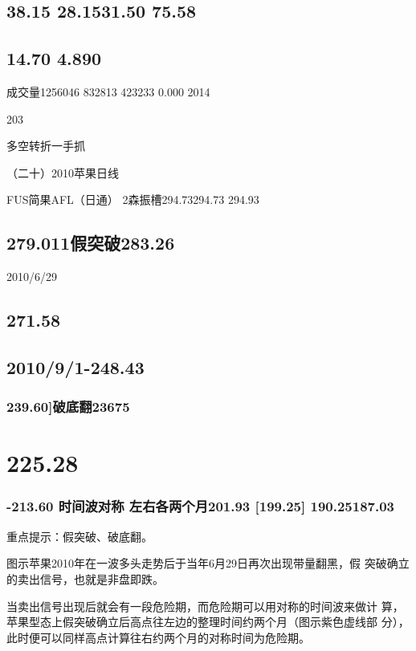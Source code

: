 \documentclass{article}
\begin{document}
\subsection{38.15 28.1531.50 75.58}

\subsection{14.70 4.890}

成交量1256046 832813 423233 0.000 2014

203

\clearpage

多空转折一手抓

（二十）2010苹果日线

FUS简果AFL（日通） 2森振槽294.73294.73 294.93

\subsection{279.011假突破283.26}

2010/6/29

\subsection{271.58}

\subsection{2010/9/1-248.43}

\subsubsection{239.60]破底翻23675}

\section{225.28}

\subsubsection{-213.60 时间波对称 左右各两个月201.93 [199.25] 190.25187.03}

重点提示：假突破、破底翻。

图示苹果2010年在一波多头走势后于当年6月29日再次出现带量翻黑，假 突破确立的卖出信号，也就是非盘即跌。

当卖出信号出现后就会有一段危险期，而危险期可以用对称的时间波来做计 算，苹果型态上假突破确立后高点往左边的整理时间约两个月（图示紫色虚线部 分），此时便可以同样高点计算往右约两个月的对称时间为危险期。
\end{document}
